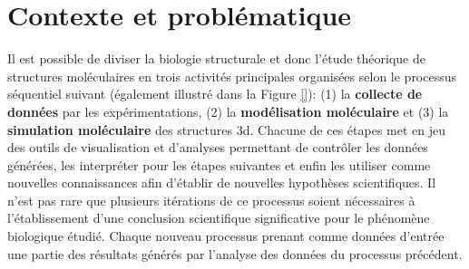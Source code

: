 



\section*{Contexte et problématique}

Il est possible de diviser la biologie structurale et donc l'étude théorique de structures moléculaires en trois activités principales organisées selon le processus séquentiel suivant (également illustré dans la Figure \ref{}): (1) la \textbf{collecte de données} par les expérimentations, (2) la \textbf{modélisation moléculaire} et (3) la \textbf{simulation moléculaire} des structures 3d. Chacune de ces étapes met en jeu des outils de visualisation et d'analyses permettant de contrôler les données générées, les interpréter pour les étapes suivantes et enfin les utiliser comme nouvelles connaissances afin d'établir de nouvelles hypothèses scientifiques. Il n'est pas rare que plusieurs itérations de ce processus soient nécessaires à l'établissement d'une conclusion scientifique significative pour le phénomène biologique étudié. Chaque nouveau processus prenant comme données d'entrée une partie des résultats générés par l'analyse des données du processus précédent.

